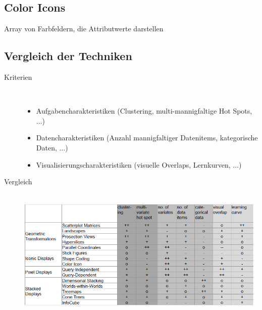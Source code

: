 \subsection{Color Icons}
Array von Farbfeldern, die Attributwerte darstellen

\subsection{Vergleich der Techniken}
\begin{description}
	\item[Kriterien] \ \\\vspace*{-\baselineskip}
		\begin{itemize}
			\item Aufgabencharakteristiken (Clustering, multi-mannigfaltige Hot Spots, $\dots$)
			\item Datencharakteristiken (Anzahl mannigfaltiger Datenitems, kategorische Daten, $\dots$)
			\item Visualisierungscharakteristiken (visuelle Overlaps, Lernkurven, $\dots$)
		\end{itemize}
	\item[Vergleich] \ \\\vspace*{-\baselineskip}
		\includegraphics[width=0.98\textwidth]{Pics/03-01-Vergleich.png}
\end{description}
\topbreak
\vspace*{-1.5\baselineskip}
